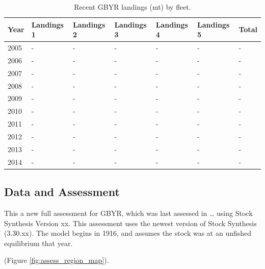 \documentclass[12pt,]{article}
\begin{document}
\begin{table}[ht]
\centering
\caption{Recent GBYR landings (mt) by 
                                            fleet.} 
\label{tab:Exec_catch}
\begin{tabular}{l>{\centering}p{1in}>{\centering}p{1in}>{\centering}p{1in}>{\centering}p{.9in}>{\centering}p{.9in}>{\centering}p{.6in}}
  \hline
Year & Landings 1 & Landings 2 & Landings 3 & Landings 4 & Landings 5 & Total \\ 
  \hline
2005 & - & - & - & - & - & - \\ 
  2006 & - & - & - & - & - & - \\ 
  2007 & - & - & - & - & - & - \\ 
  2008 & - & - & - & - & - & - \\ 
  2009 & - & - & - & - & - & - \\ 
  2010 & - & - & - & - & - & - \\ 
  2011 & - & - & - & - & - & - \\ 
  2012 & - & - & - & - & - & - \\ 
  2013 & - & - & - & - & - & - \\ 
  2014 & - & - & - & - & - & - \\ 
   \hline
\end{tabular}
\end{table}

\FloatBarrier

\newpage

\subsection*{Data and Assessment}\label{data-and-assessment}

This a new full assessment for GBYR, which was last assessed in \ldots{}
using Stock Synthesis Version xx. This assessment uses the newest
version of Stock Synthesis (3.30.xx). The model begins in 1916, and
assumes the stock was at an unfished equilibrium that year.

(Figure \ref{fig:assess_region_map}).
\end{document}
